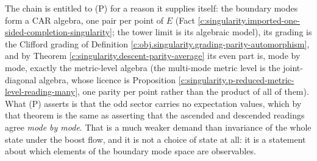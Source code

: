 \documentclass[11pt]{article}
\theoremstyle{definition}
\theoremstyle{plain}
\begin{document}
\label{c:note.singularity.setting-what-selects-state-2}
The chain is entitled to (P) for a reason it supplies itself: the boundary modes form a CAR algebra, one pair per point of $E$ (Fact \ref{c:singularity.imported-one-sided-completion-singularity}; the tower limit \cite[Thm.~5.6]{ButlerT3} is its algebraic model), its grading is the Clifford grading of Definition \ref{c:obj.singularity.grading-parity-automorphism}, and by Theorem \ref{c:singularity.descent-parity-average} its even part is, mode by mode, exactly the metric-level algebra (the multi-mode metric level is the joint-diagonal algebra, whose licence is Proposition \ref{c:singularity.p-reduced-metric-level-reading-many}, one parity per point rather than the product of all of them). What (P) asserts is that the odd sector carries no expectation values, which by that theorem is the same as asserting that the ascended and descended readings agree \emph{mode by mode}. That is a much weaker demand than invariance of the whole state under the boost flow, and it is not a choice of state at all: it is a statement about which elements of the boundary mode space are observables.
\end{document}
